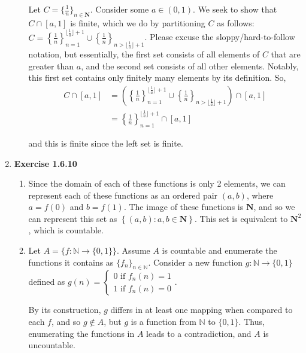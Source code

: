 \documentclass{article}
\begin{document}
\begin{enumerate}
\begin{enumerate}
            Let $C = \{\frac{1}{n}\}_{n \in \mathbf{N}}$. Consider some $a \in (0, 1)$. We seek to show that $C \cap [a, 1]$ is finite, which we do by partitioning $C$ as follows: $C = \left\{\frac{1}{n}\right\}_{n=1}^{\lfloor \frac{1}{a}\rfloor + 1} \cup \left\{\frac{1}{n}\right\}_{n> \lfloor \frac{1}{a} \rfloor + 1}$. Please excuse the sloppy/hard-to-follow notation, but essentially, the first set consists of all elements of $C$ that are greater than $a$, and the second set consists of all other elements. Notably, this first set contains only finitely many elements by its definition. So,
            \begin{align*}
                C \cap [a, 1] &= \left(\left\{\frac{1}{n}\right\}_{n=1}^{\lfloor \frac{1}{a}\rfloor + 1} \cup \left\{\frac{1}{n}\right\}_{n> \lfloor \frac{1}{a} \rfloor + 1}\right) \cap [a, 1] \\
                &= \left\{\frac{1}{n}\right\}_{n=1}^{\lfloor \frac{1}{a}\rfloor + 1} \cap [a, 1]
            \end{align*}

            and this is finite since the left set is finite. 
            
        \end{enumerate}

    \item \textbf{Exercise 1.6.10}
        \begin{enumerate}
            \item Since the domain of each of these functions is only 2 elements, we can represent each of these functions as an ordered pair $(a, b)$, where $a = f(0)$ and $b = f(1)$. The image of these functions is $\mathbf{N}$, and so we can represent this set as $\left\{(a, b) : a, b \in \mathbf{N} \right\}$. This set is equivalent to $\mathbf{N}^2$, which is countable. 

            \item Let $A = \{f: \mathbb{N} \rightarrow \{0, 1\}\}$. Assume $A$ is countable and enumerate the functions it contains as $\{f_n\}_{n\in \mathbb{N}}$. Consider a new function $g: \mathbb{N} \rightarrow \{0, 1\}$ defined as $g(n) = 
            \begin{cases}
                0 \text{ if } f_n(n) = 1 \\
                1 \text{ if } f_n(n) = 0
            \end{cases}$. 

            By its construction, $g$ differs in at least one mapping when compared to each $f$, and so $g \notin A$, but $g$ is a function from $\mathbb{N}$ to $\{0, 1\}$. Thus, enumerating the functions in $A$ leads to a contradiction, and $A$ is uncountable. 


\end{enumerate}
\end{enumerate}
\end{document}
